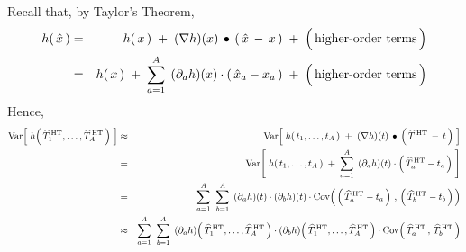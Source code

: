 \vskip 0.5cm
\noindent
Recall that, by Taylor's Theorem,
\begin{eqnarray*}
h\!\left(\,\hat{x}\,\right)
&=&
	h\!\left(\,x\,\right)
	\; + \;
	(\nabla h)(x) \,\bullet\, \left(\,\hat{x} \,-\, x\,\right)
	\; + \;
	\left(\,\overset{{\color{white}.}}{\textnormal{higher-order terms}}\,\right)
\\
&=&
	h\!\left(\,x\,\right)
	\; + \;
	\overset{A}{\underset{a=1}{\sum}} \;\, (\partial_{a}h)(x) \cdot (\,\hat{x}_{a} - x_{a}\,)
	\; + \;
	\left(\,\overset{{\color{white}.}}{\textnormal{higher-order terms}}\,\right)
\end{eqnarray*}
Hence,
\begin{eqnarray*}
\Var\!\left[\;
	h\!\left(\,\widehat{T}^{\,\textnormal{HT}}_{1},\ldots,\widehat{T}^{\,\textnormal{HT}}_{A}\,\right)
	\;\right]
&\approx&
	\Var\!\left[\;
		\overset{{\color{white}.}}{h}\!\left(\,t_{1},\ldots,t_{A}\,\right)
		\; + \;
		(\nabla h)(t) \,\bullet\, \left(\,\widehat{T}^{\,\textnormal{HT}} \,-\, t\,\right)
		\;\right]
\\
&=&
	\Var\!\left[\;
		h\!\left(\,t_{1},\ldots,t_{A}\,\right)
		\; + \;
		\overset{A}{\underset{a=1}{\sum}} \;\,
			(\partial_{a}h)(t) \cdot \left(\,\widehat{T}^{\,\textnormal{HT}}_{a} - t_{a}\,\right)
		\;\right]
\\
&=&
	\overset{A}{\underset{a=1}{\sum}} \;\;
	\overset{A}{\underset{b=1}{\sum}} \;\,
	(\partial_{a}h)(t) \cdot (\partial_{b}h)(t) \cdot
	\Cov\!\left(\,
			\left(\,\widehat{T}^{\,\textnormal{HT}}_{a} - t_{a}\,\right)
			\,,\,
			\left(\,\widehat{T}^{\,\textnormal{HT}}_{b} - t_{b}\,\right)
		\,\right)
\\
&\approx&
	\overset{A}{\underset{a=1}{\sum}} \;\;
	\overset{A}{\underset{b=1}{\sum}} \;\,
	(\partial_{a}h)\!\left(\,\widehat{T}^{\,\textnormal{HT}}_{1},\ldots,\widehat{T}^{\,\textnormal{HT}}_{A}\,\right)
	\cdot
	(\partial_{b}h)\!\left(\,\widehat{T}^{\,\textnormal{HT}}_{1},\ldots,\widehat{T}^{\,\textnormal{HT}}_{A}\,\right)
	\cdot
	\Cov\!\left(\,
			\widehat{T}^{\,\textnormal{HT}}_{a}
			\,,\,
			\widehat{T}^{\,\textnormal{HT}}_{b}
		\,\right)
\end{eqnarray*}


\renewcommand{\theenumi}{\roman{enumi}}
\renewcommand{\labelenumi}{\textnormal{(\theenumi)}$\;\;$}

